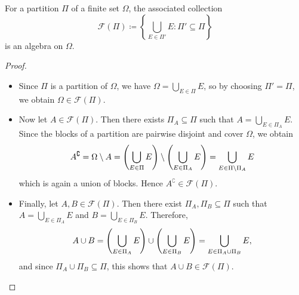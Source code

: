 \begin{proposition}\label{prop:algebra-from-partition} %
For a partition $\Pi$ of a finite set $\Omega$, the associated collection
\[
\mathcal{F}(\Pi) \coloneq \left\{ \bigcup_{E \in \Pi'} E : \Pi' \subseteq \Pi \right\}
\]
is an algebra on $\Omega$.
\end{proposition}
\begin{proof}
\begin{itemize}
\item
Since $\Pi$ is a partition of $\Omega$, we have
\(
\Omega = \bigcup_{E \in \Pi} E
\),
so by choosing $\Pi' = \Pi$, we obtain $\Omega \in \mathcal{F}(\Pi)$. \cmark
\item
Now let $A \in \mathcal{F}(\Pi)$. Then there exists $\Pi_A \subseteq \Pi$ such that
\(
A = \bigcup_{E \in \Pi_A} E
\).
Since the blocks of a partition are pairwise disjoint and cover $\Omega$, %
 we obtain
\[
A^\complement
= 
\Omega \setminus A
= 
\left(\bigcup_{E \in \Pi} E\right) \setminus \left(\bigcup_{E \in \smash[b]{\Pi_A}} E\right)
=
\bigcup_{E \in \Pi \setminus \Pi_A} E
\]
which is again a union of blocks. Hence $A^\complement \in \mathcal{F}(\Pi)$. \cmark
\item
Finally, let $A,B \in \mathcal{F}(\Pi)$. Then there exist $\Pi_A, \Pi_B \subseteq \Pi$ such that
\(
A = \bigcup_{E \in \Pi_A} E
\)
and
\(
B \allowbreak = \allowbreak \bigcup_{E \in \Pi_B} E
\).
Therefore,
\[
A \cup B
= \left(\bigcup_{E \in \smash[b]{\Pi_A}} E\right) \cup \left(\bigcup_{E \in \smash[b]{\Pi_B}} E\right)
= \bigcup_{E \in {\Pi_A} \cup {\Pi_B}} E,
\]
and since $\Pi_A \cup \Pi_B \subseteq \Pi$, this shows that $A \cup B \in \mathcal{F}(\Pi)$. \cmark
\qedhere
\end{itemize}
\end{proof}


